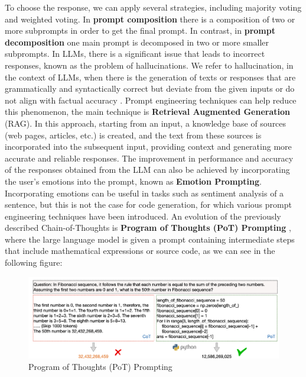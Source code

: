 To choose the response, we can apply several strategies, including majority voting and weighted voting.
In \textbf{prompt composition} there is a composition of two or more subprompts in order to get the final prompt.
In contrast, in \textbf{prompt decomposition} one main prompt is decomposed in two or more smaller subprompts.
In LLMs, there is a significant issue that leads to incorrect responses, known as the problem of hallucinations.
We refer to hallucination, in the context of LLMs, when there is the generation of texts or responses that are grammatically and syntactically correct but deviate from the given inputs or do not align with factual accuracy \cite{ye2023cognitive}.
Prompt engineering techniques can help reduce this phenomenon, the main technique is \textbf{Retrieval Augmented Generation} (RAG).
In this approach, starting from an input, a knowledge base of sources (web pages, articles, etc.) is created, and the text from these sources is incorporated into the subsequent input, providing context and generating more accurate and reliable responses.
The improvement in performance and accuracy of the responses obtained from the LLM can also be achieved by incorporating the user's emotions into the prompt, known as \textbf{Emotion Prompting}.
Incorporating emotions can be useful in tasks such as sentiment analysis of a sentence, but this is not the case for code generation, for which various prompt engineering techniques have been introduced.
An evolution of the previously described Chain-of-Thoughts is \textbf{Program of Thoughts (PoT) Prompting} \cite{chen2022program}, where the large language model is given a prompt containing intermediate steps that include mathematical expressions or source code, as we can see in the following figure:
\begin{figure}[H]
    \centering
    \includegraphics[width=0.7\linewidth]{Figures/fig_8.png}
    \caption{Program of Thoughts (PoT) Prompting}
    \label{fig:enter-label}
\end{figure}
